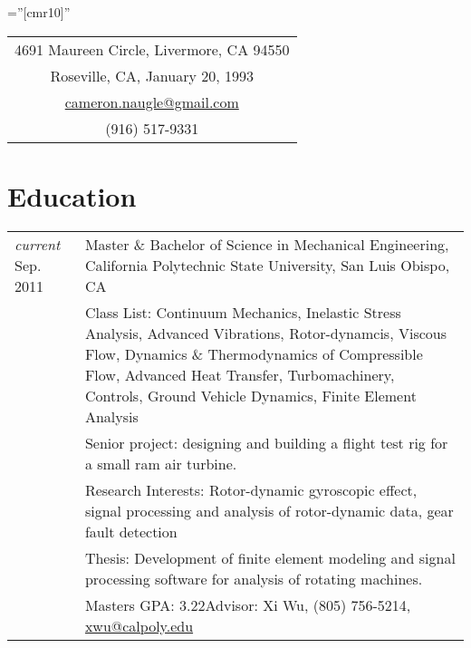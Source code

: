 \documentclass[10pt]{article} %
\newcommand{\secspace}{-.3em}
\begin{document}
\thispagestyle{empty} %

\font\fb=''[cmr10]'' %
\setlength{\linewidth}{6.5in}
\setlength{\hsize}{6.5in}

\par{\par} %


\begin{center}
	\begin{tabular} {c}
		
		4691 Maureen Circle, Livermore, CA 94550 \\
		Roseville, CA, January 20, 1993 \\
		\href{mailto:cameron.naugle@gmail.com}{cameron.naugle@gmail.com}\\
		(916) 517-9331\\[\secspace]
	\end{tabular}
\end{center}


\section{Education}

\begin{tabular}{p{.6in}|p{5.5in}}	
	\emph{current} Sep. 2011 & Master \& Bachelor of Science in Mechanical Engineering,  California Polytechnic State University, San Luis Obispo, CA\\
	& \footnotesize{Class List: Continuum Mechanics, Inelastic Stress Analysis, Advanced Vibrations, Rotor-dynamcis, Viscous Flow, Dynamics \& Thermodynamics of Compressible Flow, Advanced Heat Transfer, Turbomachinery, Controls, Ground Vehicle Dynamics, Finite Element Analysis}\\
	& \footnotesize{Senior project: designing and building a flight test rig for a small ram air turbine.}\\
	& \footnotesize{Research Interests: Rotor-dynamic gyroscopic effect, signal processing and analysis of rotor-dynamic data, gear fault detection}\\
	& \footnotesize{Thesis: Development of finite element modeling and signal processing software for analysis of rotating machines.}\\
	& \footnotesize{Masters GPA: 3.22\hfill  Advisor: Xi Wu, (805) 756-5214}, \href{mailto:xwu@calpoly.edu}{xwu@calpoly.edu}\\[\secspace]

\end{tabular}
\end{document}
